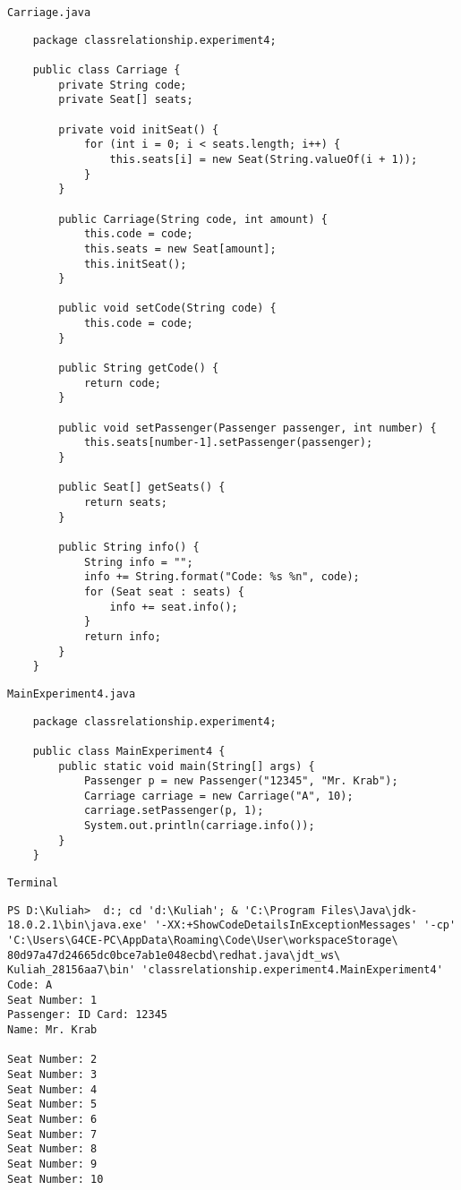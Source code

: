 \documentclass[12pt,titlepage]{article}
\begin{document}
\texttt{Carriage.java}
\begin{verbatim}
    package classrelationship.experiment4;

    public class Carriage {
        private String code;
        private Seat[] seats;
        
        private void initSeat() {
            for (int i = 0; i < seats.length; i++) {
                this.seats[i] = new Seat(String.valueOf(i + 1));
            }
        }

        public Carriage(String code, int amount) {
            this.code = code;
            this.seats = new Seat[amount];
            this.initSeat();
        }

        public void setCode(String code) {
            this.code = code;
        }

        public String getCode() {
            return code;
        }

        public void setPassenger(Passenger passenger, int number) {
            this.seats[number-1].setPassenger(passenger);
        }

        public Seat[] getSeats() {
            return seats;
        }

        public String info() {
            String info = "";
            info += String.format("Code: %s %n", code);
            for (Seat seat : seats) {
                info += seat.info();
            }
            return info;
        }
    }
\end{verbatim}
\texttt{MainExperiment4.java}
\begin{verbatim}
    package classrelationship.experiment4;

    public class MainExperiment4 {
        public static void main(String[] args) {
            Passenger p = new Passenger("12345", "Mr. Krab");
            Carriage carriage = new Carriage("A", 10);
            carriage.setPassenger(p, 1);
            System.out.println(carriage.info());
        }
    }
\end{verbatim}
\texttt{Terminal}
\begin{verbatim}
PS D:\Kuliah>  d:; cd 'd:\Kuliah'; & 'C:\Program Files\Java\jdk-18.0.2.1\bin\java.exe' '-XX:+ShowCodeDetailsInExceptionMessages' '-cp' 'C:\Users\G4CE-PC\AppData\Roaming\Code\User\workspaceStorage\ 80d97a47d24665dc0bce7ab1e048ecbd\redhat.java\jdt_ws\ Kuliah_28156aa7\bin' 'classrelationship.experiment4.MainExperiment4' 
Code: A 
Seat Number: 1
Passenger: ID Card: 12345
Name: Mr. Krab

Seat Number: 2
Seat Number: 3
Seat Number: 4
Seat Number: 5
Seat Number: 6
Seat Number: 7
Seat Number: 8
Seat Number: 9
Seat Number: 10
\end{verbatim}
\end{document}
